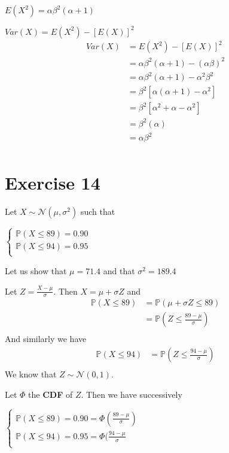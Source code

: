 \documentclass[11pt]{article}
\begin{document}
$E(X^2)=\alpha \beta^2(\alpha+1)$

$Var(X)=E(X^2)-[E(X)]^2$
\begin{align*}
Var(X)  
&=E(X^2)-[E(X)]^2\\
&=\alpha \beta^2(\alpha+1)-(\alpha \beta)^2\\
&=\alpha \beta^2(\alpha+1)-\alpha ^2 \beta ^2\\
&= \beta ^2 [\alpha(\alpha+1)-\alpha^2]\\
&= \beta ^2 [\alpha^2 +\alpha-\alpha^2]\\
&= \beta ^2 (\alpha)\\
&=  \alpha \beta ^2\\
\end{align*}


\newpage 

\section{Exercise 14}
 Let $X  \sim \mathcal N(\mu,\sigma^2)$  such that

$\begin{cases}
            \mathbb{P}(X\le 89)=0.90 \\
            \mathbb{P}(X\le 94)=0.95 \\
\end{cases}$


Let us show that $\mu=71.4$  and that $\sigma^2=189.4$

Let $Z=\frac{X-\mu}{\sigma}$. Then $X=\mu+\sigma Z$ and
\begin{align*}
\mathbb{P}(X\le 89)&=\mathbb{P}(\mu+\sigma Z\le 89)\\
&=\mathbb{P}( Z\le \frac{89-\mu}{\sigma})\\
\end{align*}
And similarly we have
\begin{align*}
\mathbb{P}(X\le 94)&=\mathbb{P}( Z\le \frac{94-\mu}{\sigma})\\
\end{align*}
We know that $Z  \sim \mathcal N(0,1)$.

Let $\Phi$ the \textbf{CDF} of $Z$. Then we have successively

$\begin{cases}
            \mathbb{P}(X\le 89)=0.90=\Phi(\frac{89-\mu}{\sigma}) \\
            \mathbb{P}(X\le 94)=0.95=\Phi(\frac{94-\mu}{\sigma} \\
\end{cases}$
\end{document}
